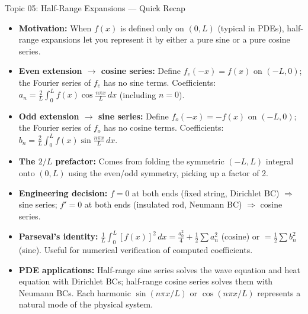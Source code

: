 \documentclass[12pt,a4paper]{article}
\begin{document}
\begin{learnbox}{Topic 05: Half-Range Expansions --- Quick Recap}
\begin{itemize}[noitemsep]
  \item \textbf{Motivation:} When $f(x)$ is defined only on $(0,L)$ (typical in PDEs), half-range expansions let you represent it by either a pure sine or a pure cosine series.
  \item \textbf{Even extension $\to$ cosine series:} Define $f_e(-x)=f(x)$ on $(-L,0)$; the Fourier series of $f_e$ has no sine terms. Coefficients: $a_n = \frac{2}{L}\int_0^L f(x)\cos\frac{n\pi x}{L}\,dx$ (including $n=0$).
  \item \textbf{Odd extension $\to$ sine series:} Define $f_o(-x)=-f(x)$ on $(-L,0)$; the Fourier series of $f_o$ has no cosine terms. Coefficients: $b_n = \frac{2}{L}\int_0^L f(x)\sin\frac{n\pi x}{L}\,dx$.
  \item \textbf{The $2/L$ prefactor:} Comes from folding the symmetric $(-L,L)$ integral onto $(0,L)$ using the even/odd symmetry, picking up a factor of 2.
  \item \textbf{Engineering decision:} $f=0$ at both ends (fixed string, Dirichlet BC) $\Rightarrow$ sine series; $f'=0$ at both ends (insulated rod, Neumann BC) $\Rightarrow$ cosine series.
  \item \textbf{Parseval's identity:} $\frac{1}{L}\int_0^L[f(x)]^2\,dx = \frac{a_0^2}{4}+\frac{1}{2}\sum a_n^2$ (cosine) or $= \frac{1}{2}\sum b_n^2$ (sine). Useful for numerical verification of computed coefficients.
  \item \textbf{PDE applications:} Half-range sine series solves the wave equation and heat equation with Dirichlet BCs; half-range cosine series solves them with Neumann BCs. Each harmonic $\sin(n\pi x/L)$ or $\cos(n\pi x/L)$ represents a natural mode of the physical system.
\end{itemize}
\end{learnbox}
\end{document}
